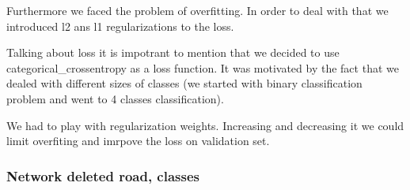 \documentclass{article}
\begin{document}
Furthermore we faced the problem of overfitting. In order to deal with
that we introduced l2 ans l1 regularizations to the loss.

Talking about loss it is impotrant to mention that we decided to use
categorical\_crossentropy as a loss function. It was motivated by the
fact that we dealed with different sizes of classes (we started with
binary classification problem and went to 4 classes classification).

We had to play with regularization weights. Increasing and decreasing it
we could limit overfiting and imrpove the loss on validation set.

    \subsubsection{Network deleted road,
classes}\label{network-deleted-road-classes}
\end{document}
